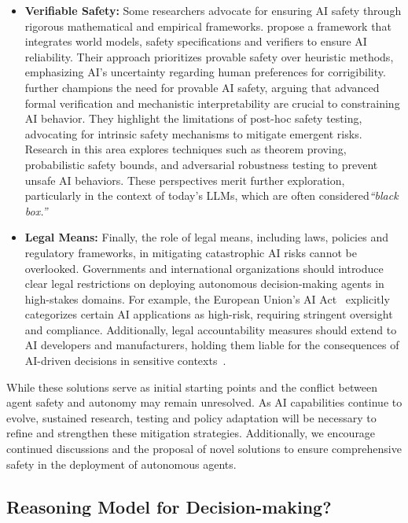 \begin{itemize}
\item \textbf{Verifiable Safety:} Some researchers advocate for ensuring AI safety through rigorous mathematical and empirical frameworks. \citet{dalrymple2024towards} propose a framework that integrates world models, safety specifications and verifiers to ensure AI reliability. Their approach prioritizes provable safety over heuristic methods, emphasizing AI’s uncertainty regarding human preferences for corrigibility. \citet{tegmark2023provably} further champions the need for provable AI safety, arguing that advanced formal verification and mechanistic interpretability are crucial to constraining AI behavior. They highlight the limitations of post-hoc safety testing, advocating for intrinsic safety mechanisms to mitigate emergent risks. Research in this area explores techniques such as theorem proving, probabilistic safety bounds, and adversarial robustness testing to prevent unsafe AI behaviors. These perspectives merit further exploration, particularly in the context of today’s LLMs, which are often considered\textit{``black box.''}

\item \textbf{Legal Means:} Finally, the role of legal means, including laws, policies and regulatory frameworks, in mitigating catastrophic AI risks cannot be overlooked. Governments and international organizations should introduce clear legal restrictions on deploying autonomous decision-making agents in high-stakes domains. For example, the European Union's AI Act~\citep{act2024eu} explicitly categorizes certain AI applications as high-risk, requiring stringent oversight and compliance. Additionally, legal accountability measures should extend to AI developers and manufacturers, holding them liable for the consequences of AI-driven decisions in sensitive contexts~\citep{giuffrida2019liability}.
\end{itemize}

While these solutions serve as initial starting points and the conflict between agent safety and autonomy may remain unresolved. As AI capabilities continue to evolve, sustained research, testing and policy adaptation will be necessary to refine and strengthen these mitigation strategies. Additionally, we encourage continued discussions and the proposal of novel solutions to ensure comprehensive safety in the deployment of autonomous agents.

\subsection{Reasoning Model for Decision-making?}

